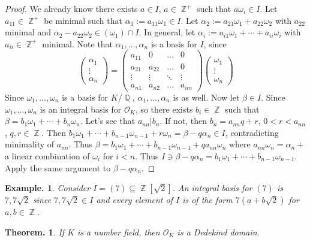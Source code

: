 \documentclass[11pt, a4paper]{memoir}
\DeclareMathOperator{\Q}{{\mathbb{Q}}}
\DeclareMathOperator{\Z}{{\mathbb{Z}}}
\theoremstyle{change}
\newtheorem{theorem}{Theorem.}[section]
\theoremstyle{plain}
\theoremstyle{nonumberplain}
\newtheorem{example}{Example.}
\newtheorem{proof}{Proof}
\begin{document}
\begin{proof}
    We already know there exists $a\in I$, $a\in\Z^+$ such that $a\omega_i\in I$.
    Let $a_{11}\in\Z^+$ be minimal such that $\alpha_1:=a_{11}\omega_1\in I$.
    Let $\alpha_2:=a_{21}\omega_1+a_{22}\omega_2$ with $a_{22}$ minimal and $\alpha_2-a_{22}\omega_2\in(\omega_1)\cap I$.
    In general, let $\alpha_i:=a_{i1}\omega_1+\cdots+a_{ii}\omega_i$ with $a_{ii}\in\Z^+$ minimal.
    Note that $\alpha_1,\ldots,\alpha_n$ is a basis for $I$, since
    \begin{equation*}
        \begin{pmatrix}\alpha_1\\\vdots\\\alpha_n\end{pmatrix} = \begin{pmatrix}a_{11}&0&\hdots&0\\a_{21}&a_{22}&\hdots&0\\\vdots&\vdots&\ddots&\vdots\\a_{n1}&a_{n2}&\hdots&a_{nn}\end{pmatrix}
        \begin{pmatrix}\omega_1\\\vdots\\\omega_n\end{pmatrix}
    \end{equation*}
    Since $\omega_1,\ldots,\omega_n$ is a basis for $K/\Q$, $\alpha_1,\ldots,\alpha_n$ is as well.
    Now let $\beta\in I$.
    Since $\omega_1,\ldots,\omega_n$ is an integral basis for $\mathcal{O}_K$, so there exists $b_i\in\Z$ such that $\beta=b_1\omega_1+\cdots+b_n\omega_n$.
    Let's see that $a_{nn}|b_n$.
    If not, then $b_n=a_{nn}q+r$, $0<r<a_{nn}$, $q,r\in\Z$.
    Then $b_1\omega_1+\cdots+b_{n-1}\omega_{n-1}+r\omega_n=\beta-q\alpha_n\in I$, contradicting minimality of $a_{nn}$.
    Thus $\beta=b_1\omega_1+\cdots+b_{n-1}\omega_{n-1}+qa_{nn}\omega_n$ where $a_{nn}\omega_n=\alpha_n+$ a linear combination of $\omega_i$ for $i<n$.
    Thus $I\ni\beta-q\alpha_n=b_1\omega_1+\cdots+b_{n-1}\omega_{n-1}$.
    Apply the same argument to $\beta-q\alpha_n$.
\end{proof}
\begin{example}
    Consider $I=(7)\subseteq\Z[\sqrt{2}]$.
    An integral basis for $(7)$ is $7,7\sqrt{2}$ since $7,7\sqrt{2}\in I$ and every element of $I$ is of the form $7(a+b\sqrt{2})$ for $a,b\in\Z$.
\end{example}
\begin{theorem}
    If $K$ is a number field, then $\mathcal{O}_K$ is a Dedekind domain.
\end{theorem}
\end{document}
